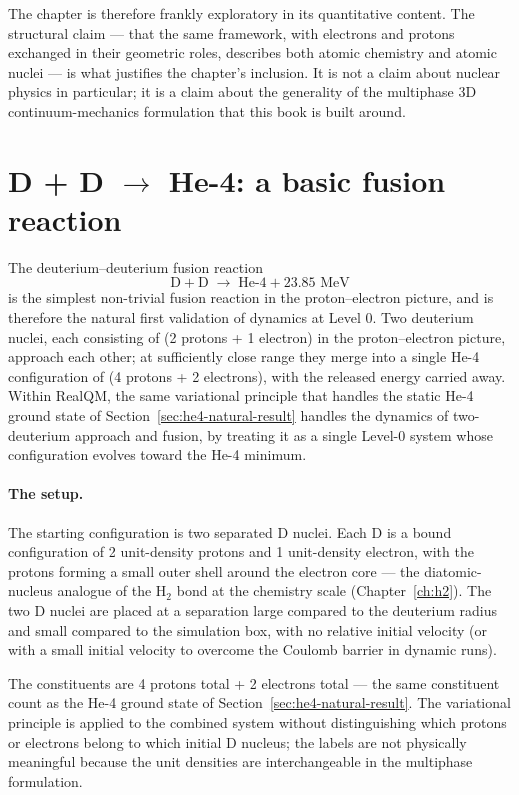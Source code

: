 The chapter is therefore frankly exploratory in its quantitative content. The structural claim --- that the same framework, with electrons and protons exchanged in their geometric roles, describes both atomic chemistry and atomic nuclei --- is what justifies the chapter's inclusion. It is not a claim about nuclear physics in particular; it is a claim about the generality of the multiphase 3D continuum-mechanics formulation that this book is built around.

\section{D + D \texorpdfstring{$\to$}{->} He-4: a basic fusion reaction}\label{sec:dd-fusion}

The deuterium--deuterium fusion reaction
\[
\text{D} + \text{D} \;\to\; \text{He-4} + 23.85 \text{ MeV}
\]
is the simplest non-trivial fusion reaction in the proton--electron picture, and is therefore the natural first validation of dynamics at Level 0. Two deuterium nuclei, each consisting of (2 protons + 1 electron) in the proton--electron picture, approach each other; at sufficiently close range they merge into a single He-4 configuration of (4 protons + 2 electrons), with the released energy carried away. Within RealQM, the same variational principle that handles the static He-4 ground state of Section~\ref{sec:he4-natural-result} handles the dynamics of two-deuterium approach and fusion, by treating it as a single Level-0 system whose configuration evolves toward the He-4 minimum.

\paragraph{The setup.}
The starting configuration is two separated D nuclei. Each D is a bound configuration of 2 unit-density protons and 1 unit-density electron, with the protons forming a small outer shell around the electron core --- the diatomic-nucleus analogue of the H$_2$ bond at the chemistry scale (Chapter~\ref{ch:h2}). The two D nuclei are placed at a separation large compared to the deuterium radius and small compared to the simulation box, with no relative initial velocity (or with a small initial velocity to overcome the Coulomb barrier in dynamic runs).

The constituents are 4 protons total + 2 electrons total --- the same constituent count as the He-4 ground state of Section~\ref{sec:he4-natural-result}. The variational principle is applied to the combined system without distinguishing which protons or electrons belong to which initial D nucleus; the labels are not physically meaningful because the unit densities are interchangeable in the multiphase formulation.

